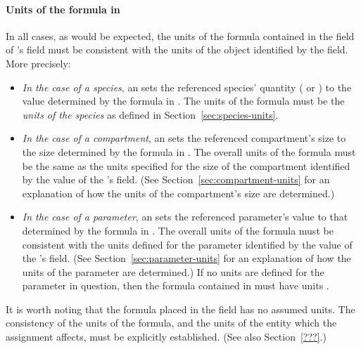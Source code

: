 \begin{blockChanged}

\paragraph{Units of the  formula in }

In all cases, as would be expected, the units of the formula
contained in the  field of \EventAssignment's field
must be consistent with the units of the object identified by the
 field.   More precisely:
\begin{itemize}
  
\item \emph{In the case of a species}, an \EventAssignment sets
  the referenced species' quantity ( or
  ) to the value determined by the
  formula in .  The units of the  formula
  must be the \emph{units of the species} as defined in
  Section~\ref{sec:species-units}.
  
\item \emph{In the case of a compartment}, an \EventAssignment
  sets the referenced compartment's size to the size determined by
  the formula in .  The overall units of the formula
  must be the same as the units specified for the size of the
  compartment identified by the value of the \EventAssignment's
   field.  (See
  Section~\ref{sec:compartment-units} for an explanation of how
  the units of the compartment's size are determined.)
  
\item \emph{In the case of a parameter}, an \EventAssignment sets
  the referenced parameter's value to that determined by the
  formula in .  The overall units of the formula must
  be consistent with the units defined for the parameter
  identified by the value of the \EventAssignment's
   field.  (See Section~\ref{sec:parameter-units}
  for an explanation of how the units of the parameter are
  determined.)  If no units are defined for the parameter in
  question, then the formula contained in  must have
  units .

\end{itemize}

It is worth noting that the formula placed in the 
field has no assumed units.  The consistency of the units of the
formula, and the units of the entity which the assignment affects,
must be explicitly established.  (See also Section~\ref{???}.)

\end{blockChanged}


